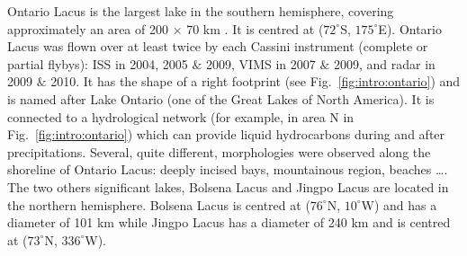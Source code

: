 Ontario Lacus is the largest lake in the southern hemisphere, covering approximately an area of 200 × 70 km \citep{wall2010active}. It is centred at ($72^\circ$S, $175^\circ$E). Ontario Lacus was flown over at least twice by each Cassini instrument (complete or partial flybys): ISS in 2004, 2005 $\&$ 2009, VIMS in 2007 $\&$ 2009, and radar in 2009 $\&$ 2010. It has the shape of a right footprint (see Fig.~\ref{fig:intro:ontario}) and is named after Lake Ontario (one of the Great Lakes of North America). It is connected to a hydrological network (for example, in area N in Fig.~\ref{fig:intro:ontario}) \citep{wall2010active, cornet2012geomorphological} which can provide liquid hydrocarbons during and after precipitations. Several, quite different, morphologies were observed along the shoreline of Ontario Lacus: deeply incised bays, mountainous region, beaches \dots \citep[see][for further details]{wall2010active, cornet2012geomorphological}. The two others significant lakes, Bolsena Lacus and Jingpo Lacus are located in the northern hemisphere. Bolsena Lacus is centred at ($76^\circ$N, $10^\circ$W) and has a diameter of 101 km while Jingpo Lacus has a diameter of 240 km and is centred at ($73^\circ$N, $336^\circ$W).

